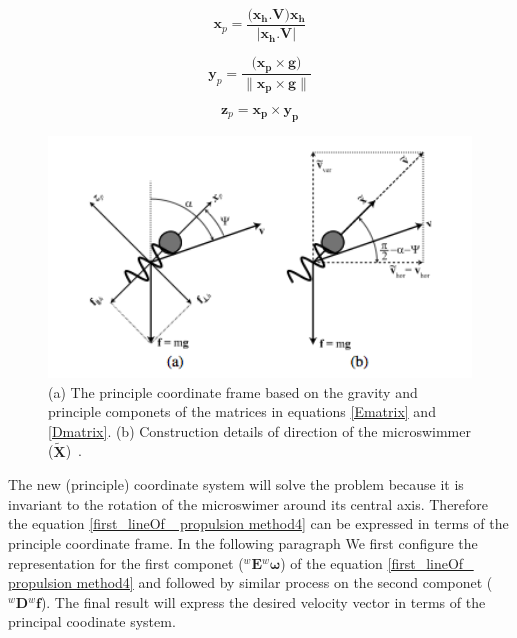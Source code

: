 \documentclass[12pt,a4paper,titlepage]{report}
\begin{document}
\begin{equation}
 \bm{x}_p = \frac{(\bm{{x}_h . V )x_h}}{|\bm{x_h .V}|}
\label{x_pAxis}
\end{equation}



\begin{equation}
 \bm{y}_p = \frac{(\bm{{x}_p \times g)}}{\| \bm{x_p \times g}\|} 
\label{y_pAxis}
\end{equation}


\begin{equation}
 \bm{z}_p = \bm{{x}_p \times {y}_p}
\label{z_pAxis}
\end{equation}


\begin{figure}
  \centering
    \includegraphics[width=1.0\textwidth]{horiz_verti_velocity}
  \caption[Construction details of 
direction of the microswimmer]{(a) The principle coordinate frame based on the gravity and principle componets
of the matrices in equations \ref{Ematrix} and \ref{Dmatrix}. (b) Construction details of 
direction of the microswimmer ($\bm{\tilde{X}}$)~\citep{mahoney2011velocity}.}
  \label{horiz_verti_velocity}
\end{figure}

The new (principle) coordinate system will solve the problem because it is invariant to the rotation
 of the microswimer around its central axis. Therefore the equation \ref{first_lineOf_ propulsion method4} can
be expressed in terms of the principle coordinate frame. In the following paragraph
We first configure the representation for the first componet (${^{w}\bm{E}} {^{w}\bm{\omega}}$) of the 
equation \ref{first_lineOf_ propulsion method4} 
 and followed by similar process on the second componet (${^{w}\bm{D}} {^{w}\bm{f}}$). The final result will express the 
desired velocity vector in terms of the principal coodinate system. 
\end{document}
